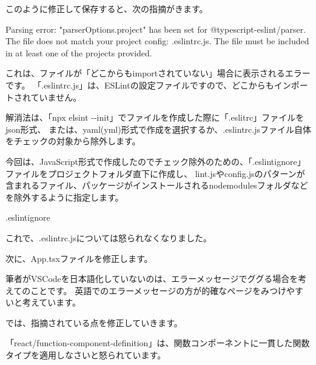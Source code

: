 このように修正して保存すると、次の指摘がきます。

\begin{starterquote}

Parsing error: "parserOptions.project" has been set for @typescript{-}eslint/parser.
The file does not match your project config: .eslintrc.js.
The file must be included in at least one of the projects provided.

\end{starterquote}

これは、ファイルが「どこからもimportされていない」場合に表示されるエラーです。
「.eslintrc.js」は、ESLintの設定ファイルですので、どこからもインポートされていません。

\vspace*{\baselineskip}

解消法は、「npx elsint {-}{-}init」でファイルを作成した際に「.eslitrc」ファイルをjson形式、
または、yaml(yml)形式で作成を選択するか、.eslintrc.jsファイル自体をチェックの対象から除外します。

\vspace*{\baselineskip}

今回は、JavaScript形式で作成したのでチェック除外のための、「.eslintignore」ファイルをプロジェクトフォルダ直下に作成し、
lint.jsやconfig.jsのパターンが含まれるファイル、パッケージがインストールされるnode\textunderscore{}modulesフォルダなどを除外するように指定します。

\def\startercodeblockfontsize{}
\begin{starterprogram}[]{.eslintignore}\end{starterprogram}

これで、.eslintrc.jsについては怒られなくなりました。

次に、App.tsxファイルを修正します。

\begin{starternote}[]{}

筆者がVSCodeを日本語化していないのは、エラーメッセージでググる場合を考えてのことです。
英語でのエラーメッセージの方が的確なページをみつけやすいと考えています。

\end{starternote}

では、指摘されている点を修正していきます。

「react/function{-}component{-}definition」は、関数コンポーネントに一貫した関数タイプを適用しなさいと怒られています。

